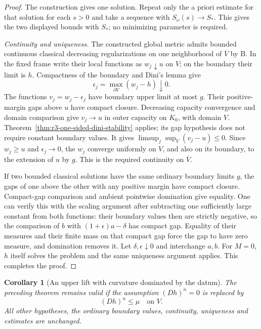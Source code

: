 \documentclass[11pt,a4paper]{article}
\numberwithin{equation}{section}
\newtheorem{corollary}[theorem]{Corollary}
\theoremstyle{definition}
\theoremstyle{remark}
\begin{document}
\begin{proof}
The construction gives one solution. Repeat only the a priori
estimate for that solution for each $s>0$ and take a sequence
with $S_\omega(s)\to S_*$. This gives the two displayed bounds
with $S_*$; no minimizing parameter is required.

\emph{Continuity and uniqueness.}
The constructed global metric admits bounded continuous classical
decreasing regularizations on one neighborhood of $\overline V$
by B. In the fixed frame write their local functions as
$w_j\downarrow u$ on $V$; on the boundary their limit is $h$.
Compactness of the boundary and Dini's lemma give
\[
 \epsilon_j=\max_{\partial V}(w_j-h)\downarrow0.
\]
The functions $v_j=w_j-\epsilon_j$ have boundary upper limit
at most $g$. Their positive-margin gaps above $u$ have compact
closure. Decreasing capacity convergence and domain comparison
give $v_j\to u$ in outer capacity on $K_0$, with domain $V$.
Theorem~\ref{thm:r3-one-sided-dini-stability} applies; its gap
hypothesis does not require constant boundary values. It gives
$\limsup_j\sup_V(v_j-u)\leq0$. Since $w_j\geq u$ and
$\epsilon_j\to0$, the $w_j$ converge uniformly on $V$, and
also on its boundary, to the extension of $u$ by $g$. This is
the required continuity on $\overline V$.

If two bounded classical solutions have the same ordinary
boundary limits $g$, the gaps of one above the other with any
positive margin have compact closure. Compact-gap comparison
and ambient pointwise domination give equality. One can verify
this with the scaling argument after subtracting one sufficiently
large constant from both functions: their boundary values then
are strictly negative, so the comparison of $b$ with
$(1+\epsilon)a-\delta$ has compact gap. Equality of their
measures and their finite mass on that compact gap force the
gap to have zero measure, and domination removes it. Let
$\delta,\epsilon\downarrow0$ and interchange $a,b$.
For $M=0$, $h$ itself solves the problem and the same uniqueness
argument applies. This completes the proof.
\end{proof}

\begin{corollary}[An upper lift with curvature dominated by the datum]
\label{cor:r3-dominated-curvature-boundary-lift}
The preceding theorem remains valid if the assumption $(Dh)^n=0$
is replaced by
\[
 (Dh)^n\leq\mu\quad\text{on }V.
\]
All other hypotheses, the ordinary boundary values, continuity,
uniqueness and estimates are unchanged.
\end{corollary}
\end{document}
